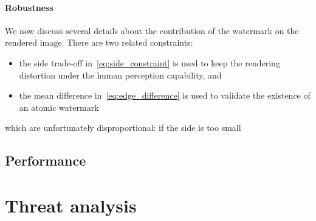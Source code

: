 \documentclass[a4paper,11pt,onecolumn]{memoir}
\begin{document}
\paragraph[Robustness]{Robustness}
We now discuss several details about the contribution of the watermark on the rendered image. There are two related constraints:
\begin{itemize}
    \item the side trade-off in~\autoref{eq:side_constraint} is used to keep the rendering distortion under the human perception capability, and
    \item the mean difference in~\autoref{eq:edge_difference} is used to validate the existence of an atomic watermark
\end{itemize}
which are unfortunately disproportional: if the side is too small

\subsection[Performance]{Performance}

\section[Threat analysis]{Threat analysis}



\backmatter

\printbibliography
\end{document}
